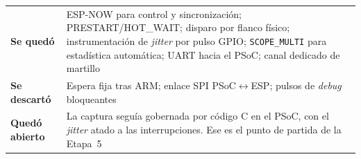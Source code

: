 \begin{center}\small
\begin{tabularx}{\textwidth}{@{}l X@{}}
\toprule
\textbf{Se qued\'o} & ESP-NOW para control y sincronizaci\'on; PRESTART/HOT\_WAIT; disparo por flanco f\'isico; instrumentaci\'on de \emph{jitter} por pulso GPIO; \texttt{SCOPE\_MULTI} para estad\'istica autom\'atica; UART hacia el PSoC; canal dedicado de martillo \\
\addlinespace[3pt]
\textbf{Se descart\'o} & Espera fija tras ARM; enlace SPI PSoC$\leftrightarrow$ESP; pulsos de \emph{debug} bloqueantes \\
\addlinespace[3pt]
\textbf{Qued\'o abierto} & La captura segu\'ia gobernada por c\'odigo C en el PSoC, con el \emph{jitter} atado a las interrupciones. Ese es el punto de partida de la Etapa~5 \\
\bottomrule
\end{tabularx}
\end{center}
